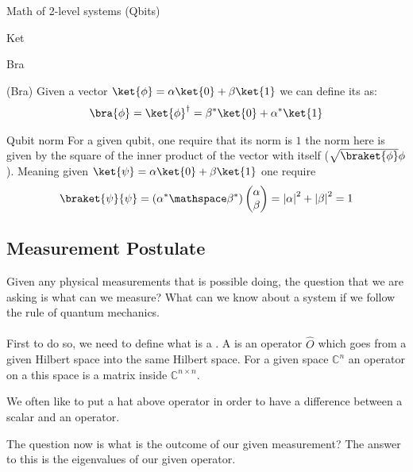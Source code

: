 \begin{parag}{Math of 2-level systems (Qbits)}
\begin{subparag}{Ket}
	\end{subparag}
	\begin{subparag}{Bra}
		\begin{definition}{(Bra)}
	    Given a vector $\ket{\phi} = \alpha \ket{0} + \beta \ket{1}$ we can define its  as:
		\begin{align*} 
			\bra{\phi} = \ket{\phi}^{\dagger} = \beta^{\ast}\ket{0} + \alpha^{\ast} \ket{1}
		\end{align*}
		\end{definition}
	\end{subparag}
	\begin{subparag}{Qubit norm}
		For a given qubit, one require that its norm is $1$ the norm here is given by the square of the inner product of the vector with itself ($\sqrt{\braket{\phi}}{\phi}$). Meaning given $\ket{\psi} = \alpha \ket{0} + \beta \ket{1}$ one require 
		\begin{align*} 
			\braket{\psi}{\psi} =  \left(\alpha^{\ast} \mathspace \beta^{\ast}\right) \begin{pmatrix} \alpha \\ \beta \end{pmatrix} =  \left|\alpha\right|^2 + \left|\beta\right|^2 = 1
		\end{align*}
	\end{subparag}


\end{parag}

\subsection{Measurement Postulate}

    Given any physical measurements that is possible doing, the question that we are asking is what can we measure? What can we know about a system if we follow the rule of quantum mechanics.\\
	$ $\\
	First to do so, we need to define what is a . A  is an operator $\hat{O}$ which goes from a given Hilbert space into the same Hilbert space. For a given space $\mathbb{C}^{n}$ an operator on a this space is a matrix inside $\mathbb{C}^{n \times n}$.
	\begin{framedremark}
	
	    We often like to put a hat above operator in order to have a difference between a scalar and an operator.
	\end{framedremark}
	The question now is what is the outcome of our given measurement? The answer to this is the eigenvalues of our given operator.

